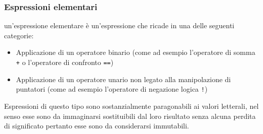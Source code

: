 \subsubsection{Espressioni elementari}
un'espressione elementare è un'espressione che ricade in una delle seguenti categorie:
\begin{itemize}
    \item Applicazione di un operatore binario (come ad esempio l'operatore di somma \texttt{+} o l'operatore di confronto \texttt{==})
    \item Applicazione di un operatore unario non legato alla manipolazione di puntatori (come ad esempio l'operatore di negazione logica \texttt{!})
\end{itemize}
Espressioni di questo tipo sono sostanzialmente paragonabili ai valori letterali, nel senso esse sono da immaginarsi 
sostituibili dal loro risultato senza alcuna perdita di significato pertanto esse sono da considerarsi immutabili.